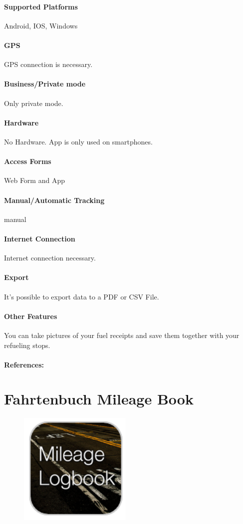 \paragraph{Supported Platforms} Android, IOS, Windows
\paragraph{GPS} GPS connection is necessary.
\paragraph{Business/Private mode} Only private mode.
\paragraph{Hardware} No Hardware. App is only used on smartphones.
\paragraph{Access Forms}Web Form and App
\paragraph{Manual/Automatic Tracking} manual
\paragraph{Internet Connection} Internet connection necessary.
\paragraph{Export} It’s possible to export data to a PDF or CSV File.
\paragraph{Other Features} You can take pictures of your fuel receipts and save them together with your refueling stops.
\paragraph{References:} \cite{Carpanion}
\newpage

\section{Fahrtenbuch Mileage Book}
\begin{figure}
  \begin{center}
    \includegraphics[width=0.48\textwidth]{bilder/mileage}
  \end{center}
\end{figure}
